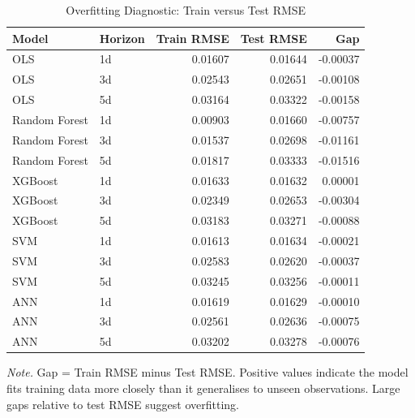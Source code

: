 \begin{table}[!ht]
\centering
\begin{threeparttable}
\caption{Overfitting Diagnostic: Train versus Test RMSE}
\label{tab:overfitting}

\begin{tabular}{llrrr}
\toprule
Model & Horizon & Train RMSE & Test RMSE & Gap\\
\midrule
OLS & 1d & 0.01607 & 0.01644 & -0.00037\\
OLS & 3d & 0.02543 & 0.02651 & -0.00108\\
OLS & 5d & 0.03164 & 0.03322 & -0.00158\\
Random Forest & 1d & 0.00903 & 0.01660 & -0.00757\\
Random Forest & 3d & 0.01537 & 0.02698 & -0.01161\\
Random Forest & 5d & 0.01817 & 0.03333 & -0.01516\\
XGBoost & 1d & 0.01633 & 0.01632 & 0.00001\\
XGBoost & 3d & 0.02349 & 0.02653 & -0.00304\\
XGBoost & 5d & 0.03183 & 0.03271 & -0.00088\\
SVM & 1d & 0.01613 & 0.01634 & -0.00021\\
SVM & 3d & 0.02583 & 0.02620 & -0.00037\\
SVM & 5d & 0.03245 & 0.03256 & -0.00011\\
ANN & 1d & 0.01619 & 0.01629 & -0.00010\\
ANN & 3d & 0.02561 & 0.02636 & -0.00075\\
ANN & 5d & 0.03202 & 0.03278 & -0.00076\\
\bottomrule
\end{tabular}
\begin{tablenotes}
\footnotesize
\item \textit{Note.} Gap = Train RMSE minus Test RMSE. Positive values indicate the model fits training data more closely than it generalises to unseen observations. Large gaps relative to test RMSE suggest overfitting.
\end{tablenotes}
\end{threeparttable}
\end{table}
